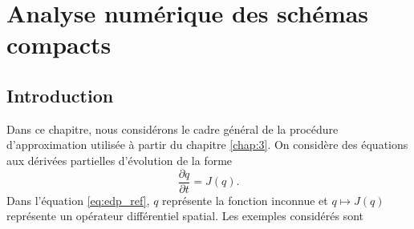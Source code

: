 \chapter{Analyse numérique des schémas compacts}
\label{chap:2}

\section{Introduction}

Dans ce chapitre, nous considérons le cadre général de la procédure d'approximation utilisée à partir du chapitre \ref{chap:3}. On considère des équations aux dérivées partielles d'évolution de la forme
\begin{equation}
\dfrac{\partial q}{\partial t} = J(q).
\label{eq:edp_ref}
\end{equation}
Dans l'équation \eqref{eq:edp_ref}, $q$ représente la fonction inconnue et $q \mapsto J(q)$ représente un opérateur différentiel spatial. Les exemples considérés sont
